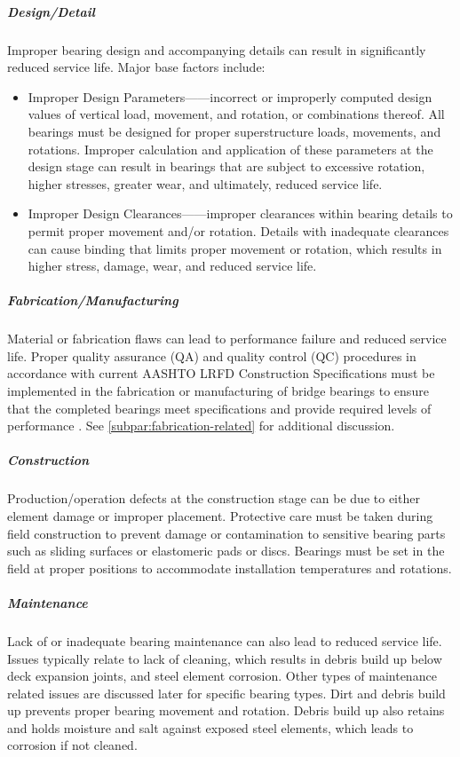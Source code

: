 \subparagraph*{Design/Detail}
Improper bearing design and accompanying details can result in significantly reduced service life. Major base
factors include:
\begin{itemize}
    \item Improper Design Parameters——incorrect or improperly computed design values of vertical load, movement,
    and rotation, or combinations thereof. All bearings must be designed for proper superstructure loads, movements, and
    rotations. Improper calculation and application of these parameters at the design stage can result in bearings that are
    subject to excessive rotation, higher stresses, greater wear, and ultimately, reduced service life.
    \item Improper Design Clearances——improper clearances within bearing details to permit proper movement and/or
    rotation. Details with inadequate clearances can cause binding that limits proper movement or rotation, which results
    in higher stress, damage, wear, and reduced service life.
\end{itemize}

\subparagraph{Fabrication/Manufacturing}
Material or fabrication flaws can lead to performance failure and reduced service life. Proper quality assurance (QA) and quality control (QC) procedures in accordance with current AASHTO LRFD Construction Specifications must be implemented in the fabrication or manufacturing of bridge bearings to ensure that the completed bearings meet specifications and provide required levels of performance \cite{aashto2010lc}. See \cref{subpar:fabrication-related} for additional discussion.

\subparagraph{Construction}
Production/operation defects at the construction stage can be due to either element damage or improper placement. Protective care must be taken during field construction to prevent damage or contamination to sensitive bearing parts such as sliding surfaces or elastomeric pads or discs. Bearings must be set in the field at proper positions to accommodate installation temperatures and rotations.

\subparagraph{Maintenance}
Lack of or inadequate bearing maintenance can also lead to reduced service life. Issues typically relate to lack of cleaning, which results in debris build up below deck expansion joints, and steel element corrosion. Other types of maintenance related issues are discussed later for specific bearing types. Dirt and debris build up prevents proper bearing movement and rotation. Debris build up also retains and holds moisture and salt against exposed steel elements, which leads to corrosion if not cleaned.


